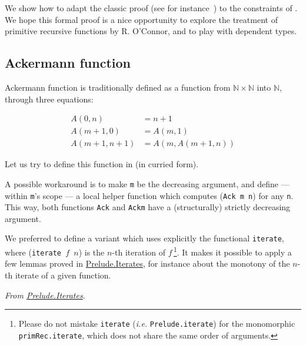 We show how to adapt the classic proof (see for instance~\cite{planetmath}) to the constraints of \gallina. We hope this formal proof 
 is a nice opportunity to explore
the treatment of primitive recursive functions by R. O'Connor,
and to play with dependent types.


\subsection{Ackermann function}

Ackermann function is traditionally defined as a function from 
$\mathbb{N}\times \mathbb{N}$ into $\mathbb{N}$, through
three equations:

\begin{align*}
A(0,n)&=n+1\\
A(m+1,0)&=A(m,1)\\
A(m+1,n+1)&=A(m,A(m+1,n))
\end{align*}

Let us try to define this function in \coq{} (in curried form).



A possible workaround is to make \texttt{m} be the 
decreasing argument, and define --- within \texttt{m}'s scope --- a local helper function which computes (\texttt{Ack m n}) for any \texttt{n}.
This way, both functions \texttt{Ack} and \texttt{Ackm} have a (structurally) strictly decreasing argument.



We preferred to define a variant which uses explicitly
 the functional \texttt{iterate},
where (\texttt{iterate\,$f$\,$n$})
is the $n$-th iteration of $f$\,\footnote{Please do not mistake
  \texttt{iterate} (\emph{i.e.} \texttt{Prelude.iterate}) for
  the monomorphic \texttt{primRec.iterate}, which does not share the same order of arguments.}. It makes it possible to apply a few lemmas proved in 
\href{../theories/html/hydras.Prelude.Iterates.html}{Prelude.Iterates}, for instance about the monotony of the $n$-th iterate of a given function. 


\vspace{4pt}
\noindent
\emph{From \href{../theories/html/hydras.Prelude.Iterates.html}{Prelude.Iterates}}.






